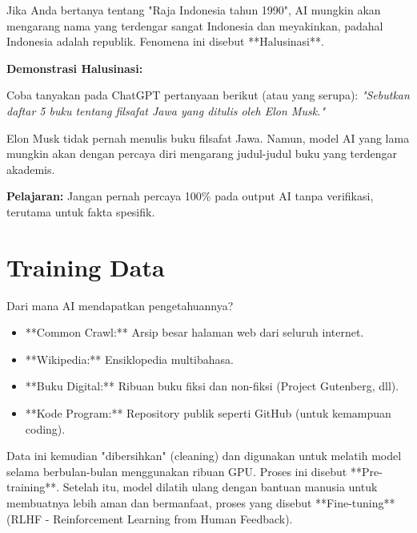 Jika Anda bertanya tentang "Raja Indonesia tahun 1990", AI mungkin akan mengarang nama yang terdengar sangat Indonesia dan meyakinkan, padahal Indonesia adalah republik. Fenomena ini disebut **Halusinasi**.

\begin{exercisebox}
\textbf{Demonstrasi Halusinasi:}

Coba tanyakan pada ChatGPT pertanyaan berikut (atau yang serupa):
\textit{"Sebutkan daftar 5 buku tentang filsafat Jawa yang ditulis oleh Elon Musk."}

Elon Musk tidak pernah menulis buku filsafat Jawa. Namun, model AI yang lama mungkin akan dengan percaya diri mengarang judul-judul buku yang terdengar akademis.

\textbf{Pelajaran:} Jangan pernah percaya 100\% pada output AI tanpa verifikasi, terutama untuk fakta spesifik.
\end{exercisebox}

\section{Training Data}

Dari mana AI mendapatkan pengetahuannya?

\begin{itemize}
    \item **Common Crawl:** Arsip besar halaman web dari seluruh internet.
    \item **Wikipedia:** Ensiklopedia multibahasa.
    \item **Buku Digital:** Ribuan buku fiksi dan non-fiksi (Project Gutenberg, dll).
    \item **Kode Program:** Repository publik seperti GitHub (untuk kemampuan coding).
\end{itemize}

Data ini kemudian "dibersihkan" (cleaning) dan digunakan untuk melatih model selama berbulan-bulan menggunakan ribuan GPU. Proses ini disebut **Pre-training**. Setelah itu, model dilatih ulang dengan bantuan manusia untuk membuatnya lebih aman dan bermanfaat, proses yang disebut **Fine-tuning** (RLHF - Reinforcement Learning from Human Feedback).
